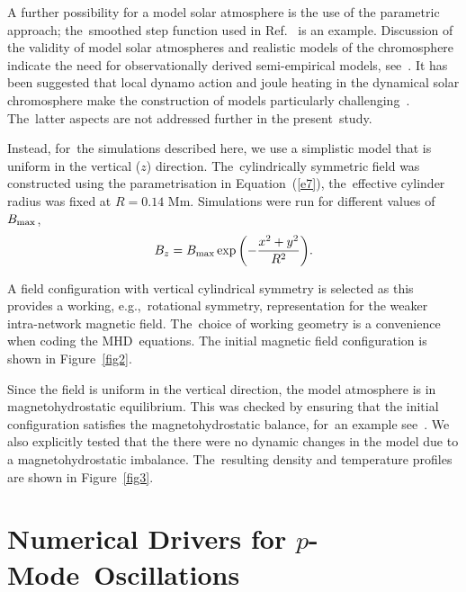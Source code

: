 \documentclass[physics,article,accept,pdftex,moreauthors]{Definitions/mdpi}
\begin{document}
A further possibility for a model solar atmosphere is the use of the parametric approach; the~smoothed step function used %
{in Ref.}~\cite{Murawski2010} is an example. Discussion of the validity of model solar atmospheres and realistic models of the chromosphere  indicate the need for observationally derived semi-empirical models, see~\cite{Carlsson1995,Kalkofen2012}. It has been suggested that local dynamo action and joule heating in the dynamical solar chromosphere make the construction of models particularly challenging~\cite{Leenaarts2011}. The~latter aspects are not addressed further in the present~study.


Instead, for~the simulations described here, we use a simplistic model  that is uniform in the vertical ($z$) direction. The~cylindrically 
symmetric field was constructed using  the parametrisation in Equation~(\ref{e7}), the~effective cylinder radius was fixed at $R=0.14$ Mm. 
Simulations were run for different values of {$B_{\rm max}$,} %
\begin{equation}
B_{z}=B_{\rm max} %
\exp{\left(-\frac{x^2+y^2}{R^2}\right)}. 
\label{e7}
\end{equation}

A field configuration with vertical cylindrical symmetry is selected as this provides a working, e.g.,~rotational symmetry, representation for  the weaker intra-network magnetic field. The~choice of working geometry is a convenience when coding the MHD~equations. The initial magnetic field configuration is shown in Figure~\ref{fig2}.

Since the field is uniform in the vertical direction, the model atmosphere is in magnetohydrostatic equilibrium. This was checked by ensuring that the initial configuration satisfies the magnetohydrostatic balance, for~an example see~\cite{Schussler2005,Gent2013}. We also explicitly tested that the there were no dynamic changes in the model due to a magnetohydrostatic imbalance. The~resulting density and temperature profiles are shown in Figure~\ref{fig3}. 


\section{Numerical Drivers for $p$-Mode~Oscillations}
\end{document}
